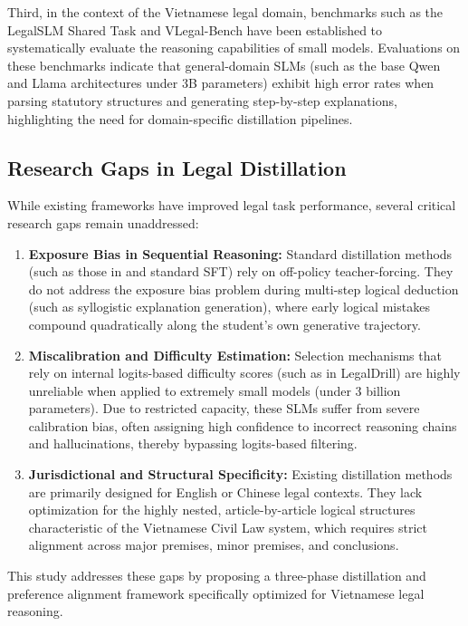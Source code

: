 Third, in the context of the Vietnamese legal domain, benchmarks such as the LegalSLM Shared Task \parencite{le-etal-2025-overview} and VLegal-Bench \parencite{dong2026vlegalbenchcognitivelygroundedbenchmark} have been established to systematically evaluate the reasoning capabilities of small models. Evaluations on these benchmarks indicate that general-domain SLMs (such as the base Qwen and Llama architectures under 3B parameters) exhibit high error rates when parsing statutory structures and generating step-by-step explanations, highlighting the need for domain-specific distillation pipelines.

\subsection{Research Gaps in Legal Distillation}

While existing frameworks have improved legal task performance, several critical research gaps remain unaddressed:
\begin{enumerate}
    \item \textbf{Exposure Bias in Sequential Reasoning:} Standard distillation methods (such as those in \parencite{italiani2025enhancing} and standard SFT) rely on off-policy teacher-forcing. They do not address the exposure bias problem during multi-step logical deduction (such as syllogistic explanation generation), where early logical mistakes compound quadratically along the student's own generative trajectory.
    \item \textbf{Miscalibration and Difficulty Estimation:} Selection mechanisms that rely on internal logits-based difficulty scores (such as in LegalDrill) are highly unreliable when applied to extremely small models (under 3 billion parameters). Due to restricted capacity, these SLMs suffer from severe calibration bias, often assigning high confidence to incorrect reasoning chains and hallucinations, thereby bypassing logits-based filtering.
    \item \textbf{Jurisdictional and Structural Specificity:} Existing distillation methods are primarily designed for English or Chinese legal contexts. They lack optimization for the highly nested, article-by-article logical structures characteristic of the Vietnamese Civil Law system, which requires strict alignment across major premises, minor premises, and conclusions.
\end{enumerate}
This study addresses these gaps by proposing a three-phase distillation and preference alignment framework specifically optimized for Vietnamese legal reasoning.
